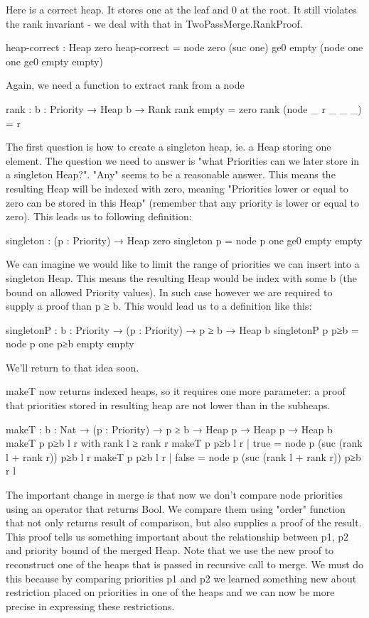 Here is a correct heap. It stores one at the leaf and 0 at the
root. It still violates the rank invariant - we deal with that in
TwoPassMerge.RankProof.
\begin{code}
heap-correct : Heap zero
heap-correct = node zero (suc one) ge0 empty (node one one ge0 empty empty)
\end{code}


Again, we need a function to extract rank from a node
\begin{code}
rank : {b : Priority} → Heap b → Rank
rank empty            = zero
rank (node _ r _ _ _) = r
\end{code}


The first question is how to create a singleton heap, ie. a Heap
storing one element. The question we need to answer is "what
Priorities can we later store in a singleton Heap?". "Any" seems to
be a reasonable answer. This means the resulting Heap will be
indexed with zero, meaning "Priorities lower or equal to zero can
be stored in this Heap" (remember that any priority is lower or
equal to zero). This leads us to following definition:
\begin{code}
singleton : (p : Priority) → Heap zero
singleton p = node p one ge0 empty empty
\end{code}


We can imagine we would like to limit the range of priorities we
can insert into a singleton Heap. This means the resulting Heap
would be index with some b (the bound on allowed Priority
values). In such case however we are required to supply a proof
than p ≥ b. This would lead us to a definition like this:

singletonP : {b : Priority} → (p : Priority) → p ≥ b → Heap b
singletonP p p≥b = node p one p≥b empty empty

We'll return to that idea soon.

makeT now returns indexed heaps, so it requires one more parameter:
a proof that priorities stored in resulting heap are not lower than
in the subheaps.
\begin{code}
makeT : {b : Nat} → (p : Priority) → p ≥ b → Heap p → Heap p → Heap b
makeT p p≥b l r with rank l ≥ rank r
makeT p p≥b l r | true  = node p (suc (rank l + rank r)) p≥b l r
makeT p p≥b l r | false = node p (suc (rank l + rank r)) p≥b r l
\end{code}


The important change in merge is that now we don't compare node
priorities using an operator that returns Bool. We compare them
using "order" function that not only returns result of comparison,
but also supplies a proof of the result. This proof tells us
something important about the relationship between p1, p2 and
priority bound of the merged Heap. Note that we use the new proof
to reconstruct one of the heaps that is passed in recursive call to
merge. We must do this because by comparing priorities p1 and p2 we
learned something new about restriction placed on priorities in one
of the heaps and we can now be more precise in expressing these
restrictions.

